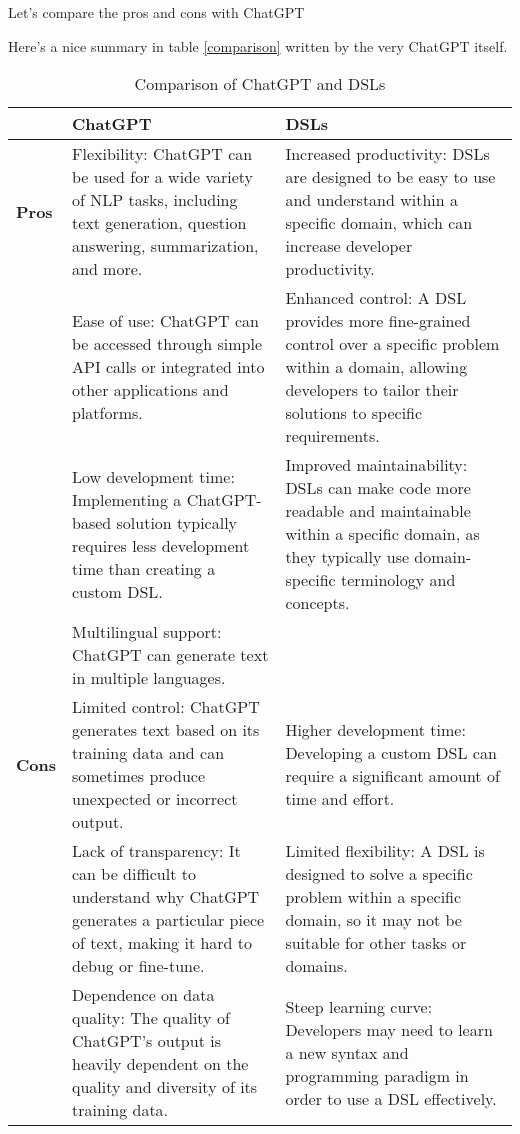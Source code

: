\documentclass[11pt, oneside]{article}   	%
\theoremstyle{definition}
\begin{document}
{Let's compare the pros and cons with ChatGPT

Here's a nice summary in table \ref{comparison} written by the very ChatGPT itself.

\begin{table}[ht]
\label{comparison}
\centering
\small %
\begin{tabular}{|l|p{6cm}|p{6cm}|}
\hline
 & \textbf{ChatGPT} & \textbf{DSLs} \\
\hline
\textbf{Pros} & 
Flexibility: ChatGPT can be used for a wide variety of NLP tasks, including text generation, question answering, summarization, and more.
&
Increased productivity: DSLs are designed to be easy to use and understand within a specific domain, which can increase developer productivity. \\
\cline{2-3}
& 
Ease of use: ChatGPT can be accessed through simple API calls or integrated into other applications and platforms.
&
Enhanced control: A DSL provides more fine-grained control over a specific problem within a domain, allowing developers to tailor their solutions to specific requirements. \\
\cline{2-3}
& 
Low development time: Implementing a ChatGPT-based solution typically requires less development time than creating a custom DSL.
&
Improved maintainability: DSLs can make code more readable and maintainable within a specific domain, as they typically use domain-specific terminology and concepts. \\
\cline{2-3}
& 
Multilingual support: ChatGPT can generate text in multiple languages.
&
 \\
\hline
\textbf{Cons} & 
Limited control: ChatGPT generates text based on its training data and can sometimes produce unexpected or incorrect output.
&
Higher development time: Developing a custom DSL can require a significant amount of time and effort. \\
\cline{2-3}
& 
Lack of transparency: It can be difficult to understand why ChatGPT generates a particular piece of text, making it hard to debug or fine-tune.
&
Limited flexibility: A DSL is designed to solve a specific problem within a specific domain, so it may not be suitable for other tasks or domains. \\
\cline{2-3}
& 
Dependence on data quality: The quality of ChatGPT's output is heavily dependent on the quality and diversity of its training data.
&
Steep learning curve: Developers may need to learn a new syntax and programming paradigm in order to use a DSL effectively. \\
\hline
\end{tabular}
\caption{Comparison of ChatGPT and DSLs}
\label{tab:chatgpt-dsls}
\end{table}

}
\end{document}
